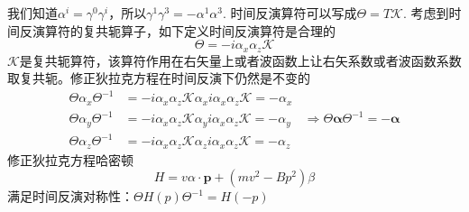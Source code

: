 \documentclass{article}
\numberwithin{equation}{subsection}
\begin{document}
我们知道$\alpha^i=\gamma^0\gamma^i$，所以$\gamma^1\gamma^3=-\alpha^1\alpha^3$. 时间反演算符可以写成$\Theta=T\mathcal{K}$. 考虑到时间反演算符的复共轭算子，如下定义时间反演算符是合理的
\begin{equation}
    \Theta=-i\alpha_x\alpha_z\mathcal{K}
\end{equation}
$\mathcal{K}$是复共轭算符，该算符作用在右矢量上或者波函数上让右矢系数或者波函数系数取复共轭。修正狄拉克方程在时间反演下仍然是不变的
\begin{equation}
    \begin{split}
        \Theta\alpha_x\Theta^{-1}&=-i\alpha_x\alpha_z\mathcal{K}\alpha_xi\alpha_x\alpha_z\mathcal{K}=-\alpha_x\\
        \Theta\alpha_y\Theta^{-1}&=-i\alpha_x\alpha_z\mathcal{K}\alpha_yi\alpha_x\alpha_z\mathcal{K}=-\alpha_y\quad\Rightarrow\Theta\mathbf{\alpha}\Theta^{-1}=-\mathbf{\alpha}\\
        \Theta\alpha_z\Theta^{-1}&=-i\alpha_x\alpha_z\mathcal{K}\alpha_zi\alpha_x\alpha_z\mathcal{K}=-\alpha_z
    \end{split}
\end{equation}
修正狄拉克方程哈密顿
\begin{equation}
    H=v\alpha\cdot\mathbf{p}+(mv^2-Bp^2)\beta
\end{equation}
满足时间反演对称性：$\Theta H(p)\Theta^{-1}=H(-p)$
\end{document}
